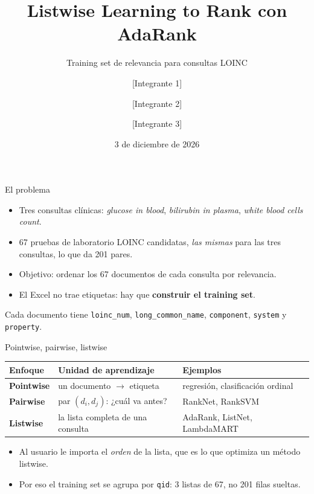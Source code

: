 \documentclass[aspectratio=169,11pt]{beamer}
\title{Listwise Learning to Rank con AdaRank}
\subtitle{Training set de relevancia para consultas LOINC}
\author{[Integrante 1] \and [Integrante 2] \and [Integrante 3]}
\institute{Machine Learned Ranking --- MUIA, UPM}
\date{3 de diciembre de 2026}
\newcommand{\code}[1]{\texttt{#1}}
\begin{document}
\maketitle

\begin{frame}{El problema}
  \begin{itemize}
    \item Tres consultas clínicas: \emph{glucose in blood}, \emph{bilirubin in plasma}, \emph{white blood cells count}.
    \item 67 pruebas de laboratorio LOINC candidatas, \emph{las mismas} para las tres consultas, lo que da 201 pares.
    \item Objetivo: ordenar los 67 documentos de cada consulta por relevancia.
    \item El Excel no trae etiquetas: hay que \textbf{construir el training set}.
  \end{itemize}
  \vspace{4pt}
  \small Cada documento tiene \code{loinc\_num}, \code{long\_common\_name}, \code{component}, \code{system} y \code{property}.
\end{frame}

\begin{frame}{Pointwise, pairwise, listwise}
  \begin{tabular}{>{\bfseries}l p{4.2cm} p{5cm}}
    \toprule
    Enfoque & Unidad de aprendizaje & Ejemplos \\
    \midrule
    Pointwise & un documento $\rightarrow$ etiqueta & regresión, clasificación ordinal \\
    Pairwise & par $(d_i,d_j)$: ¿cuál va antes? & RankNet, RankSVM \\
    Listwise & la lista completa de una consulta & \alert{AdaRank}, ListNet, LambdaMART \\
    \bottomrule
  \end{tabular}
  \vspace{8pt}
  \begin{itemize}
    \item Al usuario le importa el \emph{orden} de la lista, que es lo que optimiza un método listwise.
    \item Por eso el training set se agrupa por \code{qid}: 3 listas de 67, no 201 filas sueltas.
  \end{itemize}
\end{frame}
\end{document}
